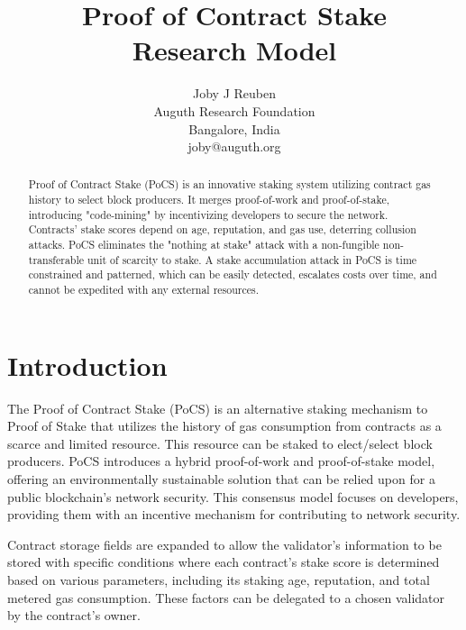 \documentclass{article}
\begin{document}
\title{Proof of Contract Stake \\ Research Model}

\author{Joby J Reuben \\
Auguth Research Foundation \\
Bangalore, India \\
joby@auguth.org
}

\maketitle

\begin{abstract}

Proof of Contract Stake (PoCS) is an innovative staking system utilizing contract gas history to select block producers. It merges proof-of-work and proof-of-stake, introducing "code-mining" by incentivizing developers to secure the network. Contracts' stake scores depend on age, reputation, and gas use, deterring collusion attacks. PoCS eliminates the "nothing at stake" attack with a non-fungible non-transferable unit of scarcity to stake. A stake accumulation attack in PoCS is time constrained and patterned, which can be easily detected, escalates costs over time, and cannot be expedited with any external resources.

\end{abstract}

\section{Introduction}

The Proof of Contract Stake (PoCS) is an alternative staking mechanism to Proof of Stake that utilizes the history of gas consumption from contracts as a scarce and limited resource. This resource can be staked to elect/select block producers. PoCS introduces a hybrid proof-of-work and proof-of-stake model, offering an environmentally sustainable solution that can be relied upon for a public blockchain's network security. This consensus model focuses on developers, providing them with an incentive mechanism for contributing to network security.

Contract storage fields are expanded to allow the validator's information to be stored with specific conditions where each contract's stake score is determined based on various parameters, including its staking age, reputation, and total metered gas consumption. These factors can be delegated to a chosen validator by the contract's owner.
\end{document}
